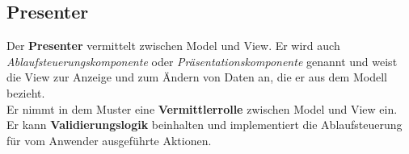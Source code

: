 \subsection*{Presenter}
Der \textbf{Presenter} vermittelt zwischen Model und View.
Er wird auch \textit{Ablaufsteuerungskomponente} oder \textit{Präsentationskomponente} genannt und weist die View zur Anzeige und zum Ändern von Daten an, die er aus dem Modell bezieht.\\
Er nimmt in dem Muster eine \textbf{Vermittlerrolle} zwischen Model und View ein.\\
Er kann \textbf{Validierungslogik} beinhalten und implementiert die Ablaufsteuerung für vom Anwender ausgeführte Aktionen.\\



